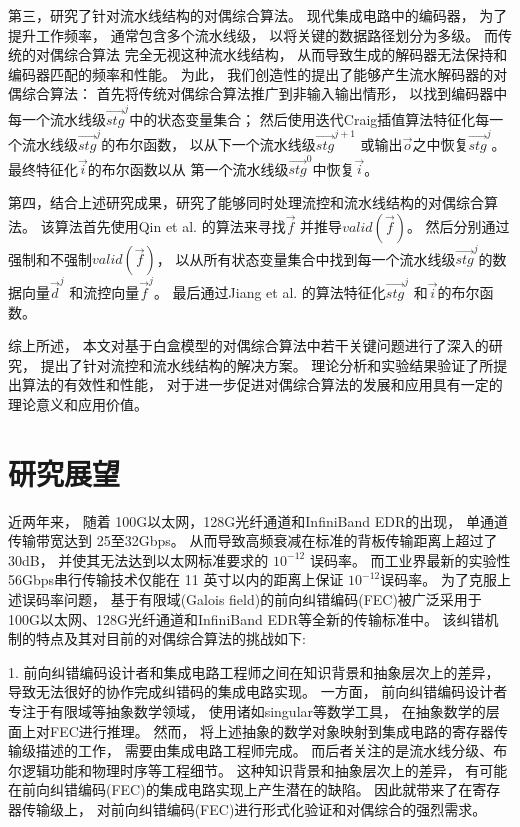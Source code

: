 第三，研究了针对流水线结构的对偶综合算法。
现代集成电路中的编码器，
为了提升工作频率，
通常包含多个流水线级，
以将关键的数据路径划分为多级。
而传统的对偶综合算法
完全无视这种流水线结构，
从而导致生成的解码器无法保持和编码器匹配的频率和性能。
为此，
我们创造性的提出了能够产生流水解码器的对偶综合算法：
首先将传统对偶综合算法推广到非输入输出情形，
以找到编码器中每一个流水线级$\vec{stg}^j$中的状态变量集合；
然后使用迭代Craig插值算法特征化每一个流水线级$\vec{stg}^j$的布尔函数，
以从下一个流水线级$\vec{stg}^{j+1}$ 或输出$\vec{o}$之中恢复$\vec{stg}^j$。
最终特征化$\vec{i}$的布尔函数以从
第一个流水线级$\vec{stg}^0$中恢复$\vec{i}$。

第四，结合上述研究成果，研究了能够同时处理流控和流水线结构的对偶综合算法。
该算法首先使用Qin et al. 的算法来寻找$\vec{f}$ 并推导$valid(\vec{f})$。
然后分别通过强制和不强制$valid(\vec{f})$，
以从所有状态变量集合中找到每一个流水线级$\vec{stg}^j$的数据向量$\vec{d}^j$ 和流控向量$\vec{f}^j$。
最后通过Jiang et al. 的算法特征化$\vec{stg}^j$ 和$\vec{i}$的布尔函数。

综上所述，
本文对基于白盒模型的对偶综合算法中若干关键问题进行了深入的研究，
提出了针对流控和流水线结构的解决方案。
理论分析和实验结果验证了所提出算法的有效性和性能，
对于进一步促进对偶综合算法的发展和应用具有一定的理论意义和应用价值。

\section{研究展望}
近两年来，
随着 100G以太网，128G光纤通道和InfiniBand EDR的出现，
单通道传输带宽达到 25至32Gbps。
从而导致高频衰减在标准的背板传输距离上超过了 30dB，
并使其无法达到以太网标准要求的 $10^{-12}$ 误码率。
而工业界最新的实验性 56Gbps串行传输技术仅能在 11 英寸以内的距离上保证 $10^{-12}$误码率。
为了克服上述误码率问题，
基于有限域(Galois field)的前向纠错编码(FEC)被广泛采用于100G以太网、128G光纤通道和InfiniBand EDR等全新的传输标准中。
该纠错机制的特点及其对目前的对偶综合算法的挑战如下:

1. 前向纠错编码设计者和集成电路工程师之间在知识背景和抽象层次上的差异，
导致无法很好的协作完成纠错码的集成电路实现。
一方面，
前向纠错编码设计者专注于有限域等抽象数学领域，
使用诸如singular等数学工具，
在抽象数学的层面上对FEC进行推理。
然而，
将上述抽象的数学对象映射到集成电路的寄存器传输级描述的工作，
需要由集成电路工程师完成。
而后者关注的是流水线分级、布尔逻辑功能和物理时序等工程细节。
这种知识背景和抽象层次上的差异，
有可能在前向纠错编码(FEC)的集成电路实现上产生潜在的缺陷。
因此就带来了在寄存器传输级上，
对前向纠错编码(FEC)进行形式化验证和对偶综合的强烈需求。

